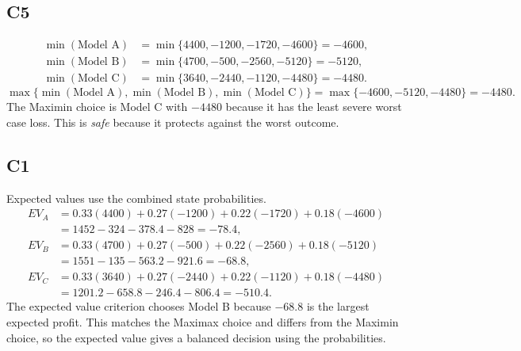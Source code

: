 \begin{ExamProblems}
		\subsection*{C5}
		\[
		\begin{aligned}
		\min(\text{Model A}) &= \min\{4400,-1200,-1720,-4600\} = -4600,\\
		\min(\text{Model B}) &= \min\{4700,-500,-2560,-5120\} = -5120,\\
		\min(\text{Model C}) &= \min\{3640,-2440,-1120,-4480\} = -4480.
		\end{aligned}
		\]
		\[
		\max\{\min(\text{Model A}), \min(\text{Model B}), \min(\text{Model C})\}
		= \max\{-4600, -5120, -4480\}
		= -4480.
		\]
		The Maximin choice is Model C with $-4480$ because it has the least severe worst case loss. This is \emph{safe} because it protects against the worst outcome.

		\subsection*{C1}
		Expected values use the combined state probabilities.
		\[
		\begin{aligned}
		EV_A &= 0.33(4400)+0.27(-1200)+0.22(-1720)+0.18(-4600)\\
		&= 1452-324-378.4-828=-78.4,\\
		EV_B &= 0.33(4700)+0.27(-500)+0.22(-2560)+0.18(-5120)\\
		&= 1551-135-563.2-921.6=-68.8,\\
		EV_C &= 0.33(3640)+0.27(-2440)+0.22(-1120)+0.18(-4480)\\
		&= 1201.2-658.8-246.4-806.4=-510.4.
		\end{aligned}
		\]
		The expected value criterion chooses Model B because $-68.8$ is the largest expected profit. This matches the Maximax choice and differs from the Maximin choice, so the expected value gives a balanced decision using the probabilities.
	\end{ExamProblems}

